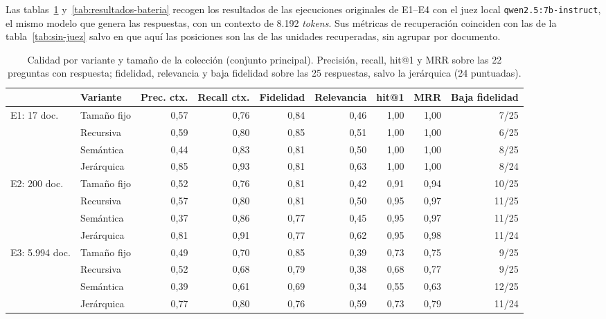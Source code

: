 Las tablas~\ref{tab:resultados-coleccion} y~\ref{tab:resultados-bateria} recogen los resultados de las ejecuciones originales de E1--E4 con el juez local \texttt{qwen2.5:7b-instruct}, el mismo modelo que genera las respuestas, con un contexto de 8.192 \emph{tokens}. Sus métricas de recuperación coinciden con las de la tabla~\ref{tab:sin-juez} salvo en que aquí las posiciones son las de las unidades recuperadas, sin agrupar por documento.

\begin{table}[tbp]
\centering\small
\setlength{\tabcolsep}{3.5pt}
\caption[Calidad por variante y tamaño de la colección (conjunto principal)]{Calidad por variante y tamaño de la colección (conjunto principal). Precisión, recall, hit@1 y MRR sobre las 22 preguntas con respuesta; fidelidad, relevancia y baja fidelidad sobre las 25 respuestas, salvo la jerárquica (24 puntuadas).}
\label{tab:resultados-coleccion}
\begin{tabular}{@{}l l rrrr rr r@{}}
\toprule
& \textbf{Variante} & \textbf{Prec. ctx.} & \textbf{Recall ctx.} & \textbf{Fidelidad} & \textbf{Relevancia} & \textbf{hit@1} & \textbf{MRR} & \textbf{Baja fidelidad} \\
\midrule
E1: 17 doc.
 & Tamaño fijo & 0,57 & 0,76 & 0,84 & 0,46 & 1,00 & 1,00 & 7/25 \\
 & Recursiva   & 0,59 & 0,80 & 0,85 & 0,51 & 1,00 & 1,00 & 6/25 \\
 & Semántica   & 0,44 & 0,83 & 0,81 & 0,50 & 1,00 & 1,00 & 8/25 \\
 & Jerárquica  & 0,85 & 0,93 & 0,81 & 0,63 & 1,00 & 1,00 & 8/24 \\
\midrule
E2: 200 doc.
 & Tamaño fijo & 0,52 & 0,76 & 0,81 & 0,42 & 0,91 & 0,94 & 10/25 \\
 & Recursiva   & 0,57 & 0,80 & 0,81 & 0,50 & 0,95 & 0,97 & 11/25 \\
 & Semántica   & 0,37 & 0,86 & 0,77 & 0,45 & 0,95 & 0,97 & 11/25 \\
 & Jerárquica  & 0,81 & 0,91 & 0,77 & 0,62 & 0,95 & 0,98 & 11/24 \\
\midrule
E3: 5.994 doc.
 & Tamaño fijo & 0,49 & 0,70 & 0,85 & 0,39 & 0,73 & 0,75 & 9/25 \\
 & Recursiva   & 0,52 & 0,68 & 0,79 & 0,38 & 0,68 & 0,77 & 9/25 \\
 & Semántica   & 0,39 & 0,61 & 0,69 & 0,34 & 0,55 & 0,63 & 12/25 \\
 & Jerárquica  & 0,77 & 0,80 & 0,76 & 0,59 & 0,73 & 0,79 & 11/24 \\
\bottomrule
\end{tabular}
\end{table}

